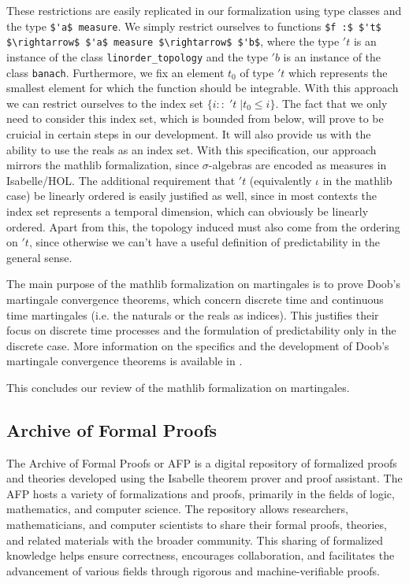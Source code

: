 These restrictions are easily replicated in our formalization using type classes and the type \lstinline[mathescape]{$'a$ measure}. We simply restrict ourselves to functions \lstinline[mathescape]{$f :$ $'t$ $\rightarrow$ $'a$ measure $\rightarrow$ $'b$}, where the type $'t$ is an instance of the class \lstinline{linorder_topology} and the type $'b$ is an instance of the class \lstinline{banach}. Furthermore, we fix an element $t_0$ of type $'t$ which represents the smallest element for which the function should be integrable. With this approach we can restrict ourselves to the index set $\{i :: \;'t \;\vert t_0 \le i\}$. The fact that we only need to consider this index set, which is bounded from below, will prove to be cruicial in certain steps in our development. It will also provide us with the ability to use the reals as an index set. With this specification, our approach mirrors the \textsf{mathlib} formalization, since $\sigma$-algebras are encoded as measures in Isabelle/HOL. The additional requirement that $'t$ (equivalently $\iota$ in the \textsf{mathlib} case) be linearly ordered is easily justified as well, since in most contexts the index set represents a temporal dimension, which can obviously be linearly ordered. Apart from this, the topology induced must also come from the ordering on $'t$, since otherwise we can't have a useful definition of predictability in the general sense.

The main purpose of the \textsf{mathlib} formalization on martingales is to prove Doob's martingale convergence theorems, which concern discrete time and continuous time martingales (i.e. the naturals or the reals as indices). This justifies their focus on discrete time processes and the formulation of predictability only in the discrete case. More information on the specifics and the development of Doob's martingale convergence theorems is available in \cite{ying2022formalization}.

This concludes our review of the \textsf{mathlib} formalization on martingales.

\subsection{Archive of Formal Proofs}

The \textsf{Archive of Formal Proofs} or \textsf{\ac{AFP}} is a digital repository of formalized proofs and theories developed using the Isabelle theorem prover and proof assistant. The \textsf{\ac{AFP}}  hosts a variety of formalizations and proofs, primarily in the fields of logic, mathematics, and computer science. The repository allows researchers, mathematicians, and computer scientists to share their formal proofs, theories, and related materials with the broader community. This sharing of formalized knowledge helps ensure correctness, encourages collaboration, and facilitates the advancement of various fields through rigorous and machine-verifiable proofs.

